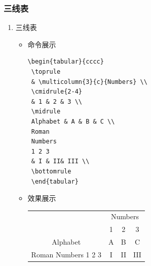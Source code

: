 \documentclass[UTF8]{ctexart}
\begin{document}
\begin{enumerate}
\begin{itemize}
\begin{mdframed}
\begin{minipage}{0.5\textwidth}
  \end{minipage}
\end{mdframed}
\end{itemize}
\end{enumerate}
\subsubsection{三线表}
\begin{enumerate}
  \item 三线表
   \begin{itemize}
      \item 命令展示
\begin{lstlisting}
\begin{tabular}{cccc}
 \toprule
 & \multicolumn{3}{c}{Numbers} \\
 \cmidrule{2-4}
 & 1 & 2 & 3 \\
 \midrule
 Alphabet & A & B & C \\
 Roman
 Numbers
 1 2 3
 & I & II& III \\
 \bottomrule
 \end{tabular}
\end{lstlisting}
\item 效果展示
\begin{tabular}{cccc}
 \toprule
 & \multicolumn{3}{c}{Numbers} \\
 \cmidrule{2-4}
 & 1 & 2 & 3 \\
 \midrule
 Alphabet & A & B & C \\
 Roman
 Numbers
 1 2 3
 & I & II& III \\
 \bottomrule
 \end{tabular}
\end{itemize}
\end{enumerate}
\end{document}

